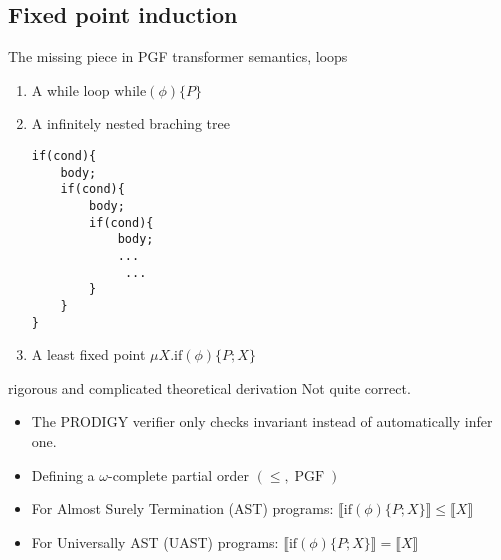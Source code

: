 \documentclass[8pt]{beamer}
\DeclareMathOperator*{\PGF}{PGF}
\renewcommand{\S}[1]{ \llbracket #1 \rrbracket }
\begin{document}
\subsection{Fixed point induction}
\begin{frame}[fragile]{The missing piece in PGF transformer semantics, loops}
	\begin{enumerate}
		\item A while loop
		      \( \mathrm{while}(\phi)\{P\} \)
		\item A infinitely nested braching tree
		      \begin{verbatim}
if(cond){
    body;
    if(cond){
        body;
        if(cond){
            body;
            ...
             ...
        }
    }
}\end{verbatim}
		\item A least fixed point
		      \( \mu X . \mathrm{if}(\phi)\{ P; X \} \)
	\end{enumerate}

	\begin{alertblock}{rigorous and complicated theoretical derivation}
		Not quite correct.
		\begin{itemize}
			\item The PRODIGY verifier only checks invariant instead of automatically infer one.
			\item Defining a \(\omega\)-complete partial order \((\leq,\PGF)\)
			\item For Almost Surely Termination (AST) programs:
			      \( \S{ \mathrm{if}(\phi)\{ P; X \} } \leq \S{ X } \)
			\item For Universally AST (UAST) programs:
			      \( \S{ \mathrm{if}(\phi)\{ P; X \} } = \S{ X } \)
		\end{itemize}
	\end{alertblock}
\end{frame}
\end{document}
